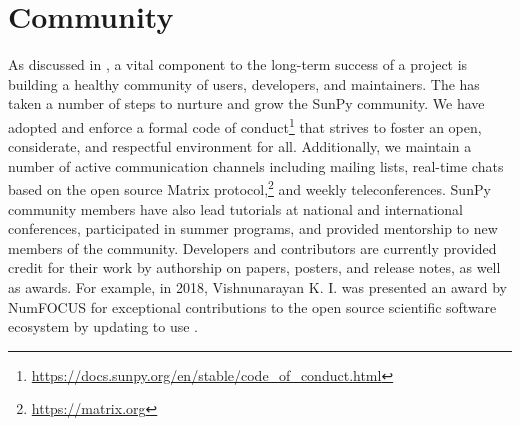 \section{Community}
\label{sec:community}

As discussed in \citet{bangerth2013}, a vital component to the long-term success of a project is building a healthy community of users, developers, and maintainers.
The \sunpyproj has taken a number of steps to nurture and grow the SunPy community.
We have adopted and enforce a formal code of conduct\footnote{\url{https://docs.sunpy.org/en/stable/code_of_conduct.html}} that strives to foster an open, considerate, and respectful environment for all.
Additionally, we maintain a number of active communication channels including mailing lists, real-time chats based on the open source Matrix protocol,\footnote{\url{https://matrix.org}} and weekly teleconferences.
SunPy community members have also lead tutorials at national and international conferences, participated in summer programs, and provided mentorship to new members of the community.
Developers and contributors are currently provided credit for their work by authorship on papers, posters, and release notes, as well as awards.
For example, in 2018, Vishnunarayan K. I. was presented an award by NumFOCUS for exceptional contributions to the open source scientific software ecosystem by updating \sunpypkg to use .
